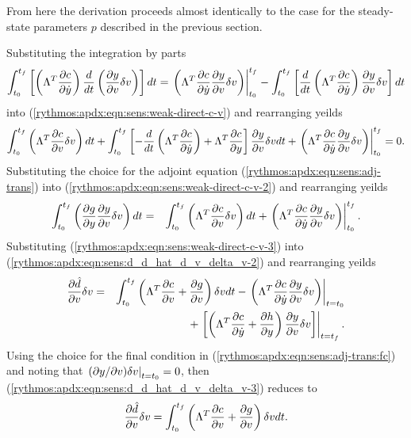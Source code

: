 \documentclass[pdf,ps2pdf,11pt]{SANDreport}
\begin{document}
From here the derivation proceeds almost identically to the case for the
steady-state parameters $p$ described in the previous section.

Substituting the integration by parts
%
\begin{equation}
\int_{t_0}^{t_f} \left[ \left( \Lambda^T \displaystyle{\frac{\partial c}{\partial \dot{y}}} \right) \frac{d}{dt}\left( \displaystyle{\frac{\partial y}{\partial v}} \delta v \right) \right] dt
= \left. \left( \Lambda^T \displaystyle{\frac{\partial c}{\partial \dot{y}}} \displaystyle{\frac{\partial y}{\partial v}} \delta v \right) \right|_{t_0}^{t_f}
- \int_{t_0}^{t_f} \left[ \frac{d}{dt}\left( \Lambda^T \displaystyle{\frac{\partial c}{\partial \dot{y}}} \right) \displaystyle{\frac{\partial y}{\partial v}} \delta v \right] dt
\end{equation}
%
into (\ref{rythmos:apdx:eqn:sens:weak-direct-c-v}) and rearranging yeilds
%
\begin{equation}
\int_{t_0}^{t_f} \left( \Lambda^T \displaystyle{\frac{\partial c}{\partial v}} \delta v \right) dt
+ \int_{t_0}^{t_f} \left[
    - \frac{d}{dt}\left( \Lambda^T \displaystyle{\frac{\partial c}{\partial \dot{y}}} \right)
    + \Lambda^T \displaystyle{\frac{\partial c}{\partial y}}
  \right] \displaystyle{\frac{\partial y}{\partial v}} \delta v dt
+ \left. \left( \Lambda^T \displaystyle{\frac{\partial c}{\partial \dot{y}}} \displaystyle{\frac{\partial y}{\partial v}} \delta v \right) \right|_{t_0}^{t_f}
= 0.
\label{rythmos:apdx:eqn:sens:weak-direct-c-v-2}
\end{equation}
%
Substituting the choice for the adjoint equation
(\ref{rythmos:apdx:eqn:sens:adj-trans}) into
(\ref{rythmos:apdx:eqn:sens:weak-direct-c-v-2}) and rearranging yeilds
%
\begin{eqnarray}
\int_{t_0}^{t_f} \left( \displaystyle{\frac{\partial g}{\partial y}} \displaystyle{\frac{\partial y}{\partial v}} \delta v \right) dt
& = &  \int_{t_0}^{t_f} \left( \Lambda^T \displaystyle{\frac{\partial c}{\partial v}} \delta v \right) dt
+ \left. \left( \Lambda^T \displaystyle{\frac{\partial c}{\partial \dot{y}}} \displaystyle{\frac{\partial y}{\partial v}} \delta v \right) \right|^{t_f}_{t_0}.
\label{rythmos:apdx:eqn:sens:weak-direct-c-v-3}
\end{eqnarray}
%
Substituting (\ref{rythmos:apdx:eqn:sens:weak-direct-c-v-3}) into
(\ref{rythmos:apdx:eqn:sens:d_d_hat_d_v_delta_v-2}) and rearranging
yeilds
%
\begin{eqnarray}
\displaystyle{\frac{\partial \hat{d}}{\partial v}} \delta v 
& = & \int_{t_0}^{t_f} \left( \Lambda^T \displaystyle{\frac{\partial c}{\partial v}} + \displaystyle{\frac{\partial g}{\partial v}} \right) \delta v dt
  - \left. \left( \Lambda^T \displaystyle{\frac{\partial c}{\partial \dot{y}}} \displaystyle{\frac{\partial y}{\partial v}} \delta v \right) \right|_{t=t_0}
\nonumber \\
& & + \left. \left[ \left(
    \Lambda^T \displaystyle{\frac{\partial c}{\partial \dot{y}}} +  \displaystyle{\frac{\partial h}{\partial y}}
  \right)  \displaystyle{\frac{\partial y}{\partial v}} \delta v \right] \right|_{t=t_f}.
\label{rythmos:apdx:eqn:sens:d_d_hat_d_v_delta_v-3}
\end{eqnarray}
%
Using the choice for the final condition in
(\ref{rythmos:apdx:eqn:sens:adj-trans:fc}) and noting that
$\left.(\partial y / \partial v)\delta v\right|_{t=t_0} = 0$, then
(\ref{rythmos:apdx:eqn:sens:d_d_hat_d_v_delta_v-3}) reduces to
%
\begin{equation}
\displaystyle{\frac{\partial \hat{d}}{\partial v}} \delta v 
 = \int_{t_0}^{t_f} \left( \Lambda^T \displaystyle{\frac{\partial c}{\partial v}} + \displaystyle{\frac{\partial g}{\partial v}} \right) \delta v dt.
\label{rythmos:apdx:eqn:sens:d_d_hat_d_v_delta_v-final}
\end{equation}
\end{document}
